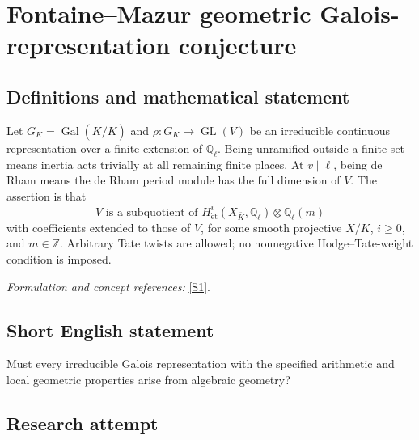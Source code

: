 \documentclass[11pt,a4paper]{article}
\newcommand{\Z}{\mathbb{Z}}
\newcommand{\Q}{\mathbb{Q}}
\newcommand{\sref}[2]{\hyperlink{source:#1:#2}{[S#2]}}
\newif\ifshowcatalogue
\newcommand{\cataloguescope}[1]{\ifshowcatalogue
 \paragraph{Exact scope in the supplied catalogue.}
 \begin{quote}\small #1\end{quote}\fi}
\numberwithin{equation}{section}
\begin{document}
\setcounter{section}{0}
\clearpage
\section*{\texorpdfstring{Fontaine–Mazur geometric Galois-representation conjecture}{Fontaine–Mazur geometric Galois-representation conjecture}}\label{9400048}
\subsection{Definitions and mathematical statement}
Let $G_K=\operatorname{Gal}(\bar K/K)$ and $\rho:G_K\to\operatorname{GL}(V)$ be an irreducible continuous representation over a finite extension of $\Q_\ell$. Being unramified outside a finite set means inertia acts trivially at all remaining finite places. At $v\mid\ell$, being de Rham means the de Rham period module has the full dimension of $V$. The assertion is that
\[
 V\text{ is a subquotient of }H^i_{\mathrm{\acute et}}(X_{\bar K},\Q_\ell)\otimes\Q_\ell(m)
\]
with coefficients extended to those of $V$, for some smooth projective $X/K$, $i\ge0$, and $m\in\Z$. Arbitrary Tate twists are allowed; no nonnegative Hodge--Tate-weight condition is imposed.
\par\smallskip\textit{Formulation and concept references:} \sref{9400048}{1}.
\cataloguescope{Let K be a number field and l a prime. Every irreducible continuous finite-dimensional l-adic representation rho of Gal(Kbar/K), unramified outside finitely many places and de Rham at every place above l, occurs as a subquotient of H\textasciicircum{}i\_et(X\_Kbar)(m) for some smooth projective variety X over K, integer i >= 0, and integer Tate twist m. Etale cohomology is taken with the same l-adic coefficient field as rho. There is no nonnegative Hodge-Tate weight restriction.}
\subsection{Short English statement}
Must every irreducible Galois representation with the specified arithmetic and local geometric properties arise from algebraic geometry?
\subsection{Research attempt}
\end{document}
